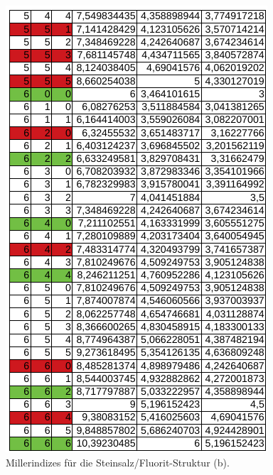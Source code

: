 \begin{figure}
  \centering
  \includegraphics{ressources/Steinsalz2.png}
  \caption{Millerindizes für die Steinsalz/Fluorit-Struktur (b).}
  \label{fig:Anhang2}
\end{figure}

